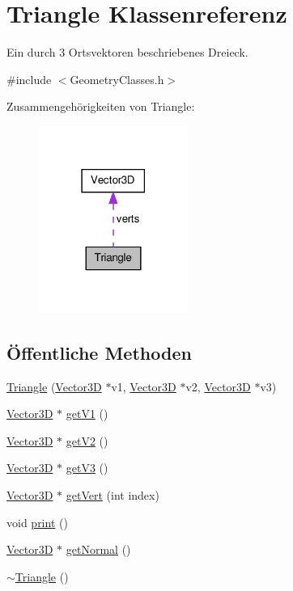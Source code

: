 \hypertarget{classTriangle}{\section{Triangle Klassenreferenz}
\label{classTriangle}
}


Ein durch 3 Ortsvektoren beschriebenes Dreieck.  




{\ttfamily \#include $<$Geometry\-Classes.\-h$>$}



Zusammengehörigkeiten von Triangle\-:\nopagebreak
\begin{figure}[H]
\begin{center}
\leavevmode
\includegraphics[width=138pt]{classTriangle__coll__graph}
\end{center}
\end{figure}
\subsection*{Öffentliche Methoden}
\begin{DoxyCompactItemize}
\item 
\hyperlink{classTriangle_aa25e2e56ac291e4366474fcbdcc6901b}{Triangle} (\hyperlink{classVector3D}{Vector3\-D} $\ast$v1, \hyperlink{classVector3D}{Vector3\-D} $\ast$v2, \hyperlink{classVector3D}{Vector3\-D} $\ast$v3)
\item 
\hyperlink{classVector3D}{Vector3\-D} $\ast$ \hyperlink{classTriangle_ae054a0eae5dae026c5af69274c5f277e}{get\-V1} ()
\item 
\hyperlink{classVector3D}{Vector3\-D} $\ast$ \hyperlink{classTriangle_a6de5f8560482f4130bdbb96b25aa1b58}{get\-V2} ()
\item 
\hyperlink{classVector3D}{Vector3\-D} $\ast$ \hyperlink{classTriangle_a792a627dc42adad87c0b30e16a6b5824}{get\-V3} ()
\item 
\hyperlink{classVector3D}{Vector3\-D} $\ast$ \hyperlink{classTriangle_a9320d1ab83c104352bf5e8f2c8274334}{get\-Vert} (int index)
\item 
void \hyperlink{classTriangle_abc3785b96e03fde1b5f594f8ed6afabb}{print} ()
\item 
\hyperlink{classVector3D}{Vector3\-D} $\ast$ \hyperlink{classTriangle_a3c72b19f316fa9ffb0a2f206e3558790}{get\-Normal} ()
\item 
\hyperlink{classTriangle_a5199760a17454f4dc94c855a57e3a152}{$\sim$\-Triangle} ()
\end{DoxyCompactItemize}
